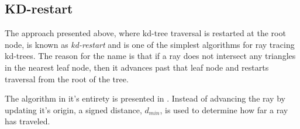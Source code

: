 \begin{figure}
{
    \label{fig:simpleTree}
  }
  \caption[A simple scene and its kd-tree.]{}
  \label{fig:simpleSceneTree}
\end{figure}


\subsection{KD-restart}\label{sec:kdRestart}


The approach presented above, where kd-tree traversal is restarted at the root
node, is known as \textit{kd-restart} and is one of the simplest algorithms for
ray tracing kd-trees. The reason for the name is that if a ray does not
intersect any triangles in the nearest leaf node, then it advances past that
leaf node and restarts traversal from the root of the tree.


The algorithm in it's entirety is presented in . Instead
of advancing the ray by updating it's origin, a signed distance, $d_{min}$, is
used to determine how far a ray has traveled.

